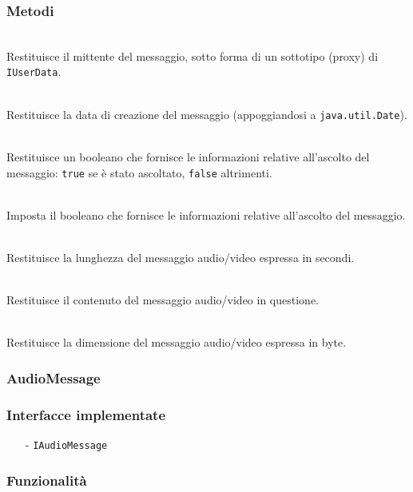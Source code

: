 \subsubsection*{Metodi}
\begin{description}
  \item{}\\
Restituisce il mittente del messaggio, sotto forma di un sottotipo (proxy) di \texttt{IUserData}.
  \item{}\\
Restituisce la data di creazione del messaggio (appoggiandosi a \texttt{java.util.Date}).
  \item{}\\
Restituisce un booleano che fornisce le informazioni relative all'ascolto del messaggio: \texttt{true} se è stato ascoltato, \texttt{false} altrimenti.
  \item{}\\
Imposta il booleano che fornisce le informazioni relative all'ascolto del messaggio.
  \item{}\\
Restituisce la lunghezza del messaggio audio/video espressa in secondi.
  \item{}\\
Restituisce il contenuto del messaggio audio/video in questione.
  \item{}\\
Restituisce la dimensione del messaggio audio/video espressa in byte.
\end{description}

\subsubsection{AudioMessage}\label{sec:audiomessage}

\subsubsection*{Interfacce implementate}
\begin{itemize}[noitemsep,nolistsep]
  \item[-]\texttt{IAudioMessage}
\end{itemize}

\subsubsection*{Funzionalità}

